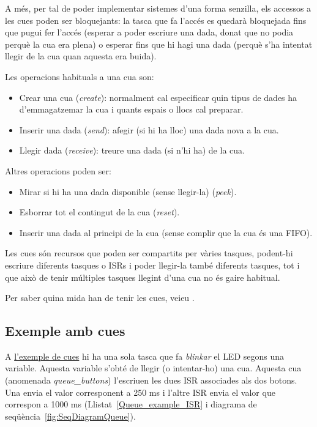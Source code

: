 A més, per tal de poder implementar sistemes d'una forma senzilla, els accessos a les cues poden ser bloquejants: la tasca que fa l'accés es quedarà bloquejada fins que pugui fer l'accés (esperar a poder escriure una dada, donat que no podia perquè la cua era plena) o esperar fins que hi hagi una dada (perquè s'ha intentat llegir de la cua quan aquesta era buida).

Les operacions habituals a una cua son:
\begin{itemize}
 \item Crear una cua ({\em create}): normalment cal especificar quin tipus de dades ha d'emmagatzemar la cua i quants espais o llocs cal preparar.
 \item Inserir una dada ({\em send}): afegir (si hi ha lloc) una dada nova a la cua.
 \item Llegir dada ({\em receive}): treure una dada (si n'hi ha) de la cua.
\end{itemize}

Altres operacions poden ser:
\begin{itemize}
 \item Mirar si hi ha una dada disponible (sense llegir-la) ({\em peek}).
 \item Esborrar tot el contingut de la cua ({\em reset}).
 \item Inserir una dada al principi de la cua (sense complir que la cua és una FIFO).
\end{itemize}

Les cues són recursos que poden ser compartits per vàries tasques, podent-hi escriure diferents tasques o \glspl{ISR} i poder llegir-la també diferents tasques, tot i que això de tenir múltiples tasques llegint d'una cua no és gaire habitual.

Per saber quina mida han de tenir les cues, veieu .
\subsection{Exemple amb cues}
\label{sub:cues_exemple}
A \href{https://github.com/mariusmm/cursembedded/tree/master/Simplicity/FreeRTOS_Queue}{l'exemple de cues} hi ha una sola tasca que fa {\em blinkar} el \gls{LED} segons una variable. Aquesta variable s'obté de llegir (o intentar-ho) una cua. Aquesta cua (anomenada {\em queue\_buttons}) l'escriuen les dues \gls{ISR} associades als dos botons. Una envia el valor corresponent a 250 ms i l'altre ISR envia el valor que correspon a 1000 ms (Llistat~\ref{Queue_example_ISR} i diagrama de seqüència~\ref{fig:SeqDiagramQueue}).

